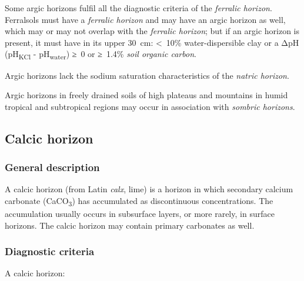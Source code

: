 \documentclass[
  letterpaper,
  DIV=11,
  numbers=noendperiod]{scrreprt}
\begin{document}
Some argic horizons fulfil all the diagnostic criteria of the
\emph{ferralic horizon}. Ferralsols must have a \emph{ferralic horizon}
and may have an argic horizon as well, which may or may not overlap with
the \emph{ferralic horizon}; but if an argic horizon is present, it must
have in its upper 30~cm: \textless~10\% water-dispersible clay or a ΔpH
(pH\textsubscript{KCl} - pH\textsubscript{water}) ≥~0 or ≥~1.4\%
\emph{soil organic carbon}.

Argic horizons lack the sodium saturation characteristics of the
\emph{natric horizon}.

Argic horizons in freely drained soils of high plateaus and mountains in
humid tropical and subtropical regions may occur in association with
\emph{sombric horizons}.

\hypertarget{calcic-horizon}{%
\subsection{Calcic horizon}\label{calcic-horizon}}

\hypertarget{general-description-3}{%
\subsubsection{General description}\label{general-description-3}}

A calcic horizon (from Latin \emph{calx}, lime) is a horizon in which
secondary calcium carbonate (CaCO\textsubscript{3}) has accumulated as
discontinuous concentrations. The accumulation usually occurs in
subsurface layers, or more rarely, in surface horizons. The calcic
horizon may contain primary carbonates as well.

\hypertarget{diagnostic-criteria-3}{%
\subsubsection{Diagnostic criteria}\label{diagnostic-criteria-3}}

A calcic horizon:
\end{document}
